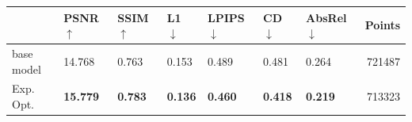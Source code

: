 \documentclass[varwidth]{standalone}
\begin{document}
\small
\setlength{\tabcolsep}{4pt}
\begin{tabular}{lllllllr}
\toprule
 & PSNR $\uparrow$ & SSIM $\uparrow$ & L1 $\downarrow$ & LPIPS $\downarrow$ & CD $\downarrow$ & AbsRel $\downarrow$ & Points \\
\midrule
base model & 14.768 & 0.763 & 0.153 & 0.489 & 0.481 & 0.264 & 721487 \\
Exp. Opt. & \textbf{15.779} & \textbf{0.783} & \textbf{0.136} & \textbf{0.460} & \textbf{0.418} & \textbf{0.219} & 713323 \\
\bottomrule
\end{tabular}
\end{document}

